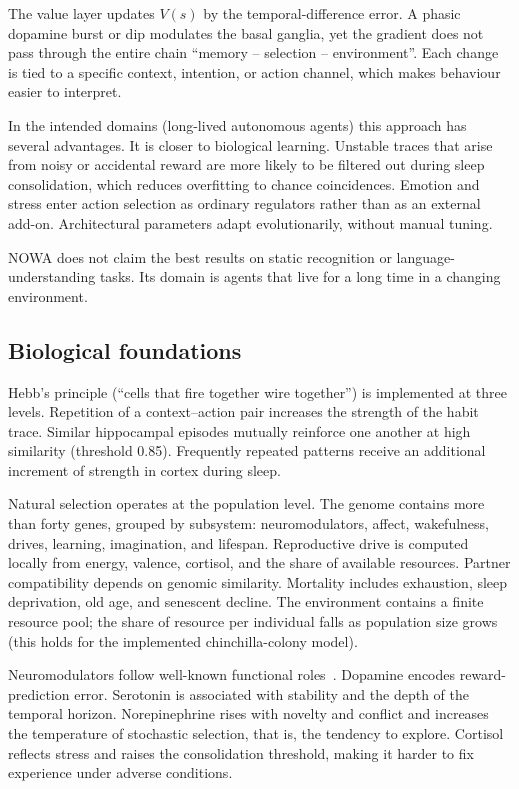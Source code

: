 \documentclass[11pt,a4paper]{article}
\begin{document}
The value layer updates \(V(s)\) by the temporal-difference error. A phasic dopamine burst or dip modulates the basal ganglia, yet the gradient does not pass through the entire chain ``memory -- selection -- environment''. Each change is tied to a specific context, intention, or action channel, which makes behaviour easier to interpret.

In the intended domains (long-lived autonomous agents) this approach has several advantages. It is closer to biological learning. Unstable traces that arise from noisy or accidental reward are more likely to be filtered out during sleep consolidation, which reduces overfitting to chance coincidences. Emotion and stress enter action selection as ordinary regulators rather than as an external add-on. Architectural parameters adapt evolutionarily, without manual tuning.

NOWA does not claim the best results on static recognition or language-understanding tasks. Its domain is agents that live for a long time in a changing environment.

\subsection{Biological foundations}

Hebb's principle (``cells that fire together wire together'') is implemented at three levels. Repetition of a context--action pair increases the strength of the habit trace. Similar hippocampal episodes mutually reinforce one another at high similarity (threshold 0.85). Frequently repeated patterns receive an additional increment of strength in cortex during sleep.

Natural selection operates at the population level. The genome contains more than forty genes, grouped by subsystem: neuromodulators, affect, wakefulness, drives, learning, imagination, and lifespan. Reproductive drive is computed locally from energy, valence, cortisol, and the share of available resources. Partner compatibility depends on genomic similarity. Mortality includes exhaustion, sleep deprivation, old age, and senescent decline. The environment contains a finite resource pool; the share of resource per individual falls as population size grows (this holds for the implemented chinchilla-colony model).

Neuromodulators follow well-known functional roles~\cite{schultz1997}. Dopamine encodes reward-prediction error. Serotonin is associated with stability and the depth of the temporal horizon. Norepinephrine rises with novelty and conflict and increases the temperature of stochastic selection, that is, the tendency to explore. Cortisol reflects stress and raises the consolidation threshold, making it harder to fix experience under adverse conditions.
\end{document}
